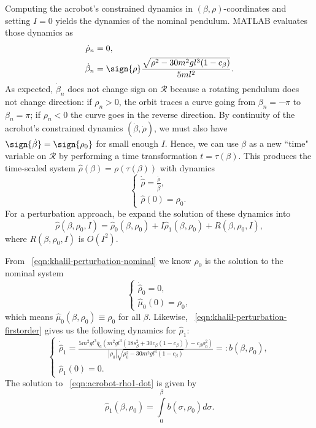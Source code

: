 Computing the acrobot's constrained dynamics in \((\beta,\rho)\)-coordinates and
setting \(I = 0\) yields the dynamics of the nominal pendulum.
MATLAB evaluates those dynamics as
\begin{align}\label{eqn:acrobot-rot-mu-dot-nom}
    \dot{\rho}_n &= 0
    , \\
    \label{eqn:acrobot-rot-alpha-dot-nom}
    \dot{\beta}_n &=  \sign{\rho} 
    \frac{\sqrt{\rho^2 - 30m^2gl^3(1 - c_\beta)}}{5ml^2}
    .
\end{align}
As expected, \(\dot{\beta}_n\) does not change sign on \(\mathcal{R}\) because
a rotating pendulum does not change direction:
if \(\rho_n > 0\), the orbit traces a curve going from \(\beta_n = -\pi\) to 
\(\beta_n = \pi\); if \(\rho_n < 0\) the curve goes in the reverse direction.
By continuity of the acrobot's constrained dynamics 
\((\dot{\beta},\dot{\rho})\), we must also have 
\(\sign{\dot{\beta}} = \sign{\rho_0}\) for small enough \(I\).
Hence, we can use \(\beta\) as a new ``time" variable on \(\mathcal{R}\) 
by performing a time transformation \(t = \tau(\beta)\).
This produces the time-scaled system \(\hat{\rho}(\beta) = \rho(\tau(\beta))\)
with dynamics
\[
    \begin{cases}
        \dot{\hat{\rho}} = \frac{\dot{\rho}}{\dot{\beta}}
        , \\
        \hat{\rho}(0) = \rho_0
        .
    \end{cases}
\]
For a perturbation approach, be expand the solution of these dynamics into
\begin{equation}\label{eqn:acrobot-rhohat-approx}
    \hat{\rho}(\beta,\rho_0,I) = \hat{\rho}_0(\beta,\rho_0) + I
    \hat{\rho}_1(\beta,\rho_0) + R(\beta,\rho_0,I)
    ,
\end{equation}
where \(R(\beta,\rho_0,I)\) is \(O(I^2)\).

From ~\eqref{eqn:khalil-perturbation-nominal} we know
\(\hat{\rho}_0\) is the solution to the nominal system
\[
    \begin{cases} 
        \dot{\hat{\rho}}_0 = 0
        , \\
        \hat{\mu}_0(0) = \rho_0
        ,
    \end{cases}
\]
which means \(\hat{\mu}_0(\beta,\rho_0) \equiv \rho_0\) for all \(\beta\).
Likewise, ~\eqref{eqn:khalil-perturbation-firstorder} 
gives us the following dynamics for \(\hat{\rho}_1\):
\begin{equation}\label{eqn:acrobot-rho1-dot}
  \begin{cases}
    \dot{\hat{\rho}}_1 =
    \frac{5m^2 g l^3 \bar{q}_a \left(
        m^2gl^3\left(18s_\beta^2 + 30c_\beta(1 - c_\beta)\right)
        - c_\beta\rho_0^2
    \right)}{
    |\rho_0|\sqrt{\rho_0^2 - 30m^2gl^3(1 - c_\beta)}
    }
    =: b(\beta,\rho_0)
     , \\
     \hat{\rho}_1(0) = 0
     .
 \end{cases}
\end{equation}
The solution to ~\eqref{eqn:acrobot-rho1-dot} is given by
\[
    \hat{\rho}_1(\beta,\rho_0) = \int \limits_0^\beta b(\sigma,\rho_0)d\sigma
    .
\]


